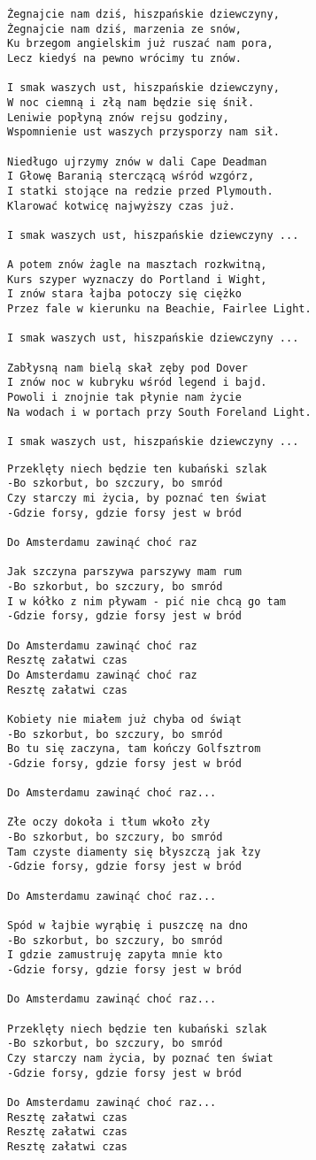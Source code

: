 \documentclass[12pt]{article}
\begin{document}
\begin{verbatim}
Żegnajcie nam dziś, hiszpańskie dziewczyny,
Żegnajcie nam dziś, marzenia ze snów,
Ku brzegom angielskim już ruszać nam pora,
Lecz kiedyś na pewno wrócimy tu znów.

I smak waszych ust, hiszpańskie dziewczyny,
W noc ciemną i złą nam będzie się śnił.
Leniwie popłyną znów rejsu godziny,
Wspomnienie ust waszych przysporzy nam sił.

Niedługo ujrzymy znów w dali Cape Deadman
I Głowę Baranią sterczącą wśród wzgórz,
I statki stojące na redzie przed Plymouth.
Klarować kotwicę najwyższy czas już.

I smak waszych ust, hiszpańskie dziewczyny ...

A potem znów żagle na masztach rozkwitną,
Kurs szyper wyznaczy do Portland i Wight,
I znów stara łajba potoczy się ciężko
Przez fale w kierunku na Beachie, Fairlee Light.

I smak waszych ust, hiszpańskie dziewczyny ...

Zabłysną nam bielą skał zęby pod Dover
I znów noc w kubryku wśród legend i bajd.
Powoli i znojnie tak płynie nam życie
Na wodach i w portach przy South Foreland Light.

I smak waszych ust, hiszpańskie dziewczyny ...
\end{verbatim}
\clearpage

\begin{verbatim}
Przeklęty niech będzie ten kubański szlak
-Bo szkorbut, bo szczury, bo smród
Czy starczy mi życia, by poznać ten świat
-Gdzie forsy, gdzie forsy jest w bród

Do Amsterdamu zawinąć choć raz

Jak szczyna parszywa parszywy mam rum
-Bo szkorbut, bo szczury, bo smród
I w kółko z nim pływam - pić nie chcą go tam
-Gdzie forsy, gdzie forsy jest w bród

Do Amsterdamu zawinąć choć raz
Resztę załatwi czas
Do Amsterdamu zawinąć choć raz
Resztę załatwi czas

Kobiety nie miałem już chyba od świąt
-Bo szkorbut, bo szczury, bo smród
Bo tu się zaczyna, tam kończy Golfsztrom
-Gdzie forsy, gdzie forsy jest w bród

Do Amsterdamu zawinąć choć raz...

Złe oczy dokoła i tłum wkoło zły
-Bo szkorbut, bo szczury, bo smród
Tam czyste diamenty się błyszczą jak łzy
-Gdzie forsy, gdzie forsy jest w bród

Do Amsterdamu zawinąć choć raz...

Spód w łajbie wyrąbię i puszczę na dno
-Bo szkorbut, bo szczury, bo smród
I gdzie zamustruję zapyta mnie kto
-Gdzie forsy, gdzie forsy jest w bród

Do Amsterdamu zawinąć choć raz...

Przeklęty niech będzie ten kubański szlak
-Bo szkorbut, bo szczury, bo smród
Czy starczy nam życia, by poznać ten świat
-Gdzie forsy, gdzie forsy jest w bród

Do Amsterdamu zawinąć choć raz...
Resztę załatwi czas
Resztę załatwi czas
Resztę załatwi czas
\end{verbatim}
\clearpage
\end{document}
